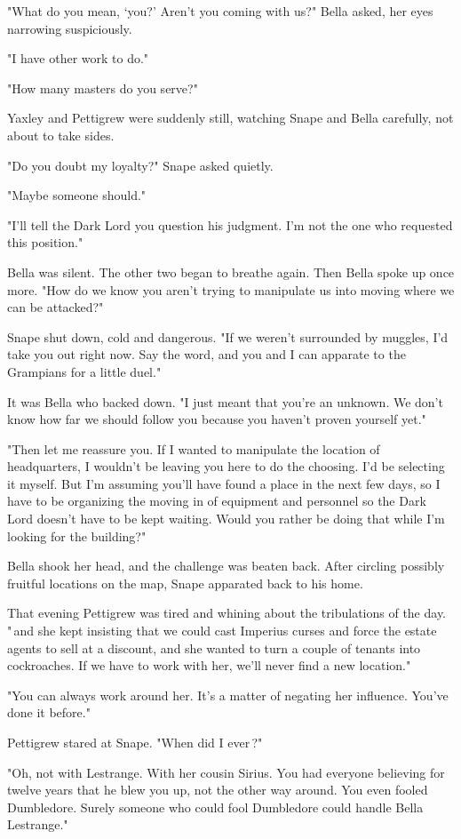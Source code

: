 "What do you mean, `you?' Aren't you coming with us?" Bella asked, her eyes narrowing suspiciously.

"I have other work to do."

"How many masters do you serve?"

Yaxley and Pettigrew were suddenly still, watching Snape and Bella carefully, not about to take sides.

"Do you doubt my loyalty?" Snape asked quietly.

"Maybe someone should."

"I'll tell the Dark Lord you question his judgment. I'm not the one who requested this position."

Bella was silent. The other two began to breathe again. Then Bella spoke up once more. "How do we know you aren't trying to manipulate us into moving where we can be attacked?"

Snape shut down, cold and dangerous. "If we weren't surrounded by muggles, I'd take you out right now. Say the word, and you and I can apparate to the Grampians for a little duel."

It was Bella who backed down. "I just meant that you're an unknown. We don't know how far we should follow you because you haven't proven yourself yet."

"Then let me reassure you. If I wanted to manipulate the location of headquarters, I wouldn't be leaving you here to do the choosing. I'd be selecting it myself. But I'm assuming you'll have found a place in the next few days, so I have to be organizing the moving in of equipment and personnel so the Dark Lord doesn't have to be kept waiting. Would you rather be doing that while I'm looking for the building?"

Bella shook her head, and the challenge was beaten back. After circling possibly fruitful locations on the map, Snape apparated back to his home.

That evening Pettigrew was tired and whining about the tribulations of the day. "{\el}\,and she kept insisting that we could cast Imperius curses and force the estate agents to sell at a discount, and she wanted to turn a couple of tenants into cockroaches. If we have to work with her, we'll never find a new location."

"You can always work around her. It's a matter of negating her influence. You've done it before."

Pettigrew stared at Snape. "When did I ever{\el}\,?"

"Oh, not with Lestrange. With her cousin Sirius. You had everyone believing for twelve years that he blew you up, not the other way around. You even fooled Dumbledore. Surely someone who could fool Dumbledore could handle Bella Lestrange."

